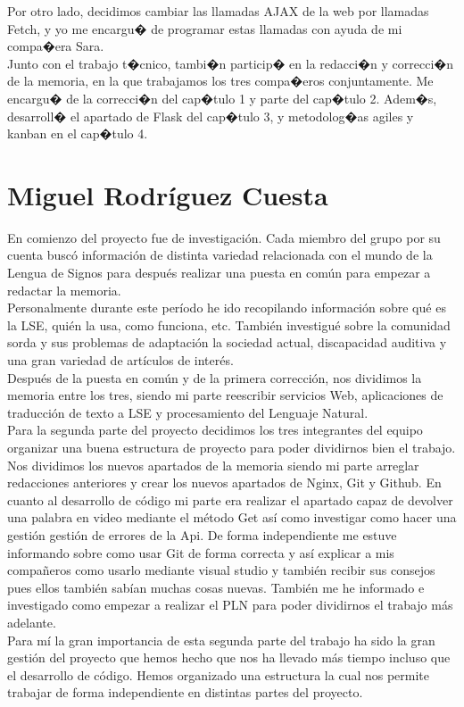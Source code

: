 Por otro lado, decidimos cambiar las llamadas AJAX de la web  por llamadas Fetch, y yo me encargu� de programar estas llamadas con ayuda de mi compa�era Sara. \\

Junto con el trabajo t�cnico, tambi�n particip� en la redacci�n y correcci�n  de la memoria, en la que trabajamos los tres compa�eros conjuntamente. Me encargu� de la correcci�n del cap�tulo 1 y parte del cap�tulo 2. Adem�s, desarroll� el apartado de Flask del cap�tulo 3,  y metodolog�as agiles y kanban en el cap�tulo 4.\\
\section{Miguel Rodríguez Cuesta}
\label{capTrabajoIndividual:sec:Miguel}

En comienzo del proyecto fue de investigación. Cada miembro del grupo por su cuenta buscó información de distinta variedad relacionada con el mundo de la Lengua de Signos para después realizar una puesta en común para empezar a redactar la memoria.\\

Personalmente durante este período he ido recopilando información sobre qué es la LSE, quién la usa, como funciona, etc. También investigué sobre la comunidad sorda y sus problemas de adaptación la sociedad actual, discapacidad auditiva y una gran variedad de artículos de interés.\\

Después de la puesta en común y de la primera corrección, nos dividimos la memoria entre los tres, siendo mi parte reescribir servicios Web, aplicaciones de traducción de texto a LSE y procesamiento del Lenguaje Natural.\\

Para la segunda parte del proyecto decidimos los tres integrantes del equipo organizar una buena estructura de proyecto para poder dividirnos bien el trabajo.
Nos dividimos los nuevos apartados de la memoria siendo mi parte arreglar redacciones anteriores y crear los nuevos apartados de Nginx, Git y Github.
En cuanto al desarrollo de código mi parte era realizar el apartado capaz de devolver una palabra en video mediante el método Get así como investigar como hacer  una gestión gestión de errores de la Api. De forma independiente me estuve informando sobre como usar Git de forma correcta y así explicar a mis compañeros como usarlo mediante visual studio y también recibir sus consejos pues ellos también sabían muchas cosas nuevas. También me he informado e investigado como empezar a realizar el PLN para poder dividirnos el trabajo más adelante.\\

Para mí la gran importancia de esta segunda parte del trabajo ha sido la gran gestión del proyecto que hemos hecho que nos ha llevado más tiempo incluso que el desarrollo de código. Hemos organizado una estructura la cual nos permite trabajar de forma independiente en distintas partes del proyecto.\\


